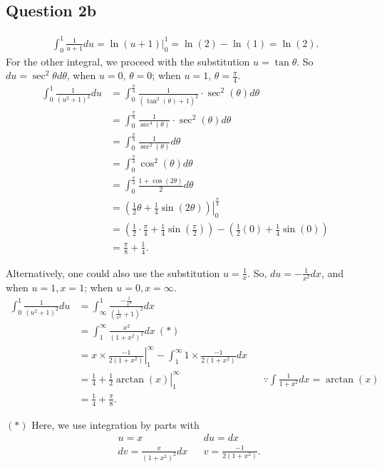 \documentclass[12pt]{article}
\begin{document}
\subsection*{Question 2b}
\begin{align*}
    \int_0^1\frac{1}{u+1}du = \ln(u+1)|_0^1 = \ln(2)-\ln(1) = \ln(2).
\end{align*}
For the other integral, we proceed with the substitution $u=\tan\theta$. So $du = \sec^2\theta d\theta$, when $u=0$, $\theta=0$; when $u=1$, $\theta=\frac{\pi}{4}$.
\begin{align*}
    \int_0^1\frac{1}{(u^2+1)^2}du &= \int_0^{\frac{\pi}{4}}\frac{1}{(\tan^2(\theta)+1)^2}\cdot\sec^2(\theta) d\theta\\
    &=\int_0^{\frac{\pi}{4}}\frac{1}{\sec^4(\theta)}\cdot\sec^2(\theta) d\theta\\
    &=\int_0^{\frac{\pi}{4}}\frac{1}{\sec^2(\theta)} d\theta\\
    &=\int_0^{\frac{\pi}{4}}\cos^2(\theta) d\theta\\
    &=\int_0^{\frac{\pi}{4}}\frac{1+\cos(2\theta)}{2} d\theta\\
    &=\left.\left(\frac{1}{2}\theta + \frac{1}{4}\sin(2\theta)\right)\right|_0^{\frac{\pi}{4}}\\
    &= \left(\frac{1}{2} \cdot \frac{\pi}{4} + \frac{1}{4}\sin\left(\frac{\pi}{2}\right)\right)-\left(\frac{1}{2}(0)+\frac{1}{4}\sin(0)\right)\\
    &= \frac{\pi}{8}+\frac{1}{4}.
\end{align*}

\newpage
Alternatively, one could also use the substitution $u=\frac{1}{x}$. So, $du=-\frac{1}{x^2} dx$, and when $u=1,x=1$; when $u=0,x=\infty$.
\begin{align*}
    \int_0^1\frac{1}{(u^2+1)^2} du
    &= \int_\infty^1 \frac{-\frac{1}{x^2}}{\left(\frac{1}{x^2}+1\right)^2}dx\\
    &= \int^\infty_1 \frac{x^2}{\left(1+x^2\right)^2}dx\:(*)\\
    &= \left.x\times\frac{-1}{2(1+x^2)}\right|^\infty_1 - \int^\infty_1 1\times\frac{-1}{2(1+x^2)}dx\\
    &= \frac{1}{4}+\left.\frac{1}{2}\arctan(x)\right|_1^\infty && \because\int \frac{1}{1+x^2}dx=\arctan(x)\\
    &= \frac{1}{4}+\frac{\pi}{8}.
\end{align*}

$(*)$ Here, we use integration by parts with
\begin{align*}
    &u=x                        && du=dx \\
    &dv=\frac{x}{(1+x^2)^2}dx   && v=\frac{-1}{2(1+x^2)}.
\end{align*}
\end{document}
